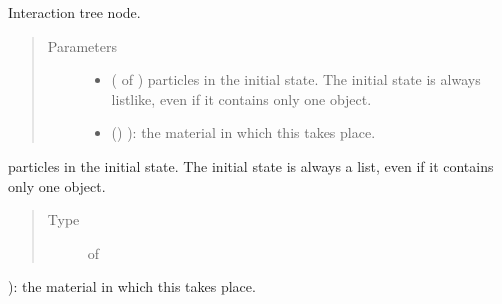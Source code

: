 \documentclass[letterpaper,10pt,english]{sphinxmanual}
\begin{document}
\begin{fulllineitems}
\label{\detokenize{code_structure:scdc.event.Event}}
Interaction tree node.
\begin{quote}\begin{description}
\item[{Parameters}] \leavevmode\begin{itemize}
\item {} 
 ( of ) \textendash{} particles in the
initial state. The initial state is always listlike, even if it
contains only one object.

\item {} 
\sphinxstyleliteralstrong{\sphinxupquote{(}} () \textendash{} ): the material in which this takes place.

\end{itemize}

\end{description}\end{quote}

\begin{fulllineitems}
\label{\detokenize{code_structure:scdc.event.Event.initial_state}}
particles in the
initial state. The initial state is always a list, even if it
contains only one object.
\begin{quote}\begin{description}
\item[{Type}] \leavevmode
{} of 

\end{description}\end{quote}

\end{fulllineitems}



\begin{fulllineitems}
): the material in which this takes place.


\end{fulllineitems}
\end{fulllineitems}
\end{document}
